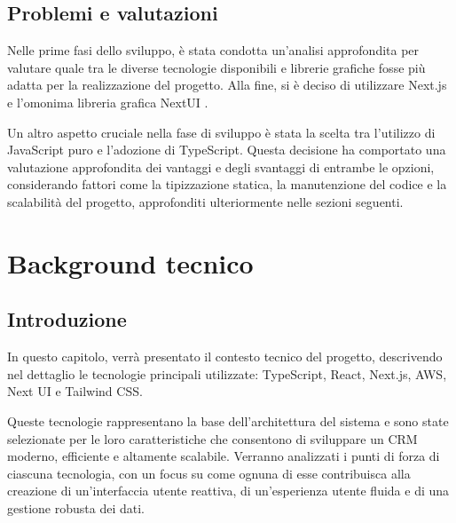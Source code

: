 \documentclass[target=bach,aauheader=,style=]{thud}
\begin{document}
\section{Problemi e valutazioni}
Nelle prime fasi dello sviluppo, è stata condotta un'analisi approfondita per valutare quale tra le diverse tecnologie disponibili e librerie grafiche fosse più adatta per la realizzazione del progetto. Alla fine, si è deciso di utilizzare Next.js \cite{nextjs2024} e l'omonima libreria grafica NextUI \cite{nextui2024}. 

\noindent Un altro aspetto cruciale nella fase di sviluppo è stata la scelta tra l'utilizzo di JavaScript puro e l'adozione di TypeScript. Questa decisione ha comportato una valutazione approfondita dei vantaggi e degli svantaggi di entrambe le opzioni, considerando fattori come la tipizzazione statica, la manutenzione del codice e la scalabilità del progetto, approfonditi ulteriormente nelle sezioni seguenti.


\chapter{Background tecnico}

\section{Introduzione}
In questo capitolo, verrà presentato il contesto tecnico del progetto, descrivendo nel dettaglio le tecnologie principali utilizzate: TypeScript, React, Next.js, AWS, Next UI e Tailwind CSS. 

\noindent Queste tecnologie rappresentano la base dell'architettura del sistema e sono state selezionate per le loro caratteristiche che consentono di sviluppare un CRM moderno, efficiente e altamente scalabile. Verranno analizzati i punti di forza di ciascuna tecnologia, con un focus su come ognuna di esse contribuisca alla creazione di un'interfaccia utente reattiva, di un'esperienza utente fluida e di una gestione robusta dei dati.
\end{document}
